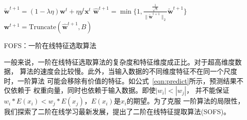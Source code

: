 \documentclass[doctor]{ustcthesis}
\def \w  {\mathbf{w}}
\def \x {\mathbf{x}}
\def \Truncate {\mbox{Truncate}}
\begin{document}
\IncMargin{1em}
\begin{algorithm}

\Output{截断的权重向量$\w$}
\BlankLine
$\tilde{\w}^{t+1} = (1-\lambda\eta)\w^t + \eta y^t \x^t$\;
$\hat{\w}^{t+1} = \min\{1,\frac{\frac{1}{\sqrt{\lambda}}}{\|\tilde{\w}^{t+1}\|_2}\tilde{\w}^{t+1}\}$\;
$\w^{t+1} = \Truncate(\hat{\w}^{t+1}, B)$\;
\caption{FOFS：一阶在线特征选取算法}\label{alg:fofs}
\end{algorithm}\DecMargin{1em}

一般来说，一阶在线特征选取算法的复杂度和特征维度成正比。对于超高维度数据，
算法的速度会比较慢。此外，当输入数据的不同维度特征不在同一个尺度时，一阶算法
可能会移除有价值的特征。如公式~\eqref{eqn:predict}所示，预测结果不仅依赖于
权重向量，同时也依赖于输入数据。即使$|w_i|<|w_j|$，
并不能保证$w_i * E(x_i) < w_j * E(x_j)$，$E(x_i)$是$x_i$的期望。为了克服
一阶算法的局限性，我们探索了二阶在线学习最新发展，提出了二阶在线特征提取算法(SOFS)。
\end{document}
